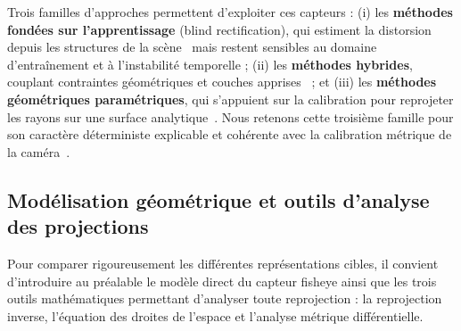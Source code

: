\documentclass[11pt,a4paper]{article}
\renewcommand{\emph}[1]{\textup{#1}}
\begin{document}
Trois familles d'approches permettent d'exploiter ces capteurs : (i) les \textbf{méthodes fondées sur l'apprentissage} (\emph{blind rectification}), qui estiment la distorsion depuis les structures de la scène~\cite{rong2017,bogdan2018deepcalib,xue2019lines} mais restent sensibles au domaine d'entraînement et à l'instabilité temporelle ; (ii) les \textbf{méthodes hybrides}, couplant contraintes géométriques et couches apprises~\cite{jaderberg2015stn,coors2018spherenet} ; et (iii) les \textbf{méthodes géométriques paramétriques}, qui s'appuient sur la calibration pour reprojeter les rayons sur une surface analytique~\cite{kannala2006,plaut2021}. Nous retenons cette troisième famille pour son caractère déterministe explicable et cohérente avec la calibration métrique de la caméra~\cite{opencvfisheye}.


\subsection{Modélisation géométrique et outils d'analyse des projections}

Pour comparer rigoureusement les différentes représentations cibles, il convient d'introduire au préalable le modèle direct du capteur fisheye ainsi que les trois outils mathématiques permettant d'analyser toute reprojection : la reprojection inverse, l'équation des droites de l'espace et l'analyse métrique différentielle.
\end{document}
